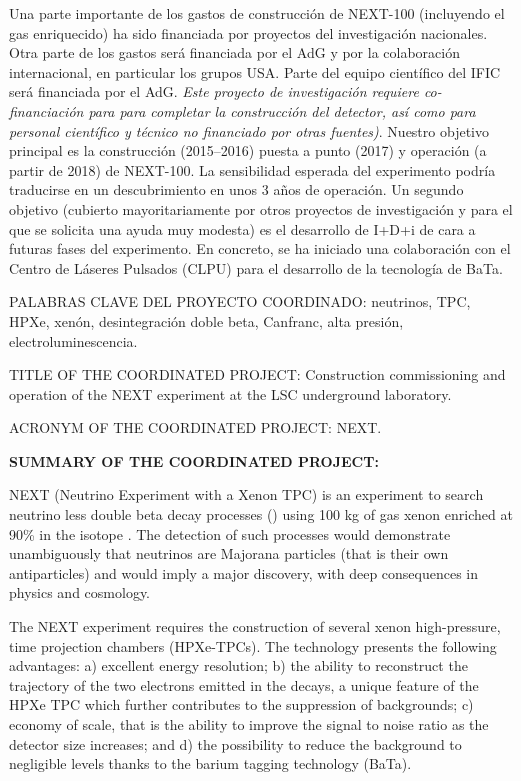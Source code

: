 \documentclass[a4paper,11pt,oneside]{article}
\begin{document}
Una parte importante de los gastos de construcción de NEXT-100 (incluyendo el gas enriquecido) ha sido financiada por proyectos del investigación nacionales. 
 Otra parte de los gastos será financiada por el AdG y por la colaboración internacional, en particular los grupos USA. Parte del equipo científico del IFIC será financiada por el AdG. {\em Este  proyecto de investigación requiere co-financiación para para completar la construcción del detector, así como para personal científico y técnico no financiado por otras fuentes)}. Nuestro objetivo principal es la construcción (2015--2016) puesta a punto (2017) y operación (a partir de 2018) de NEXT-100. La sensibilidad esperada del experimento podría traducirse en un descubrimiento en unos 3 años de operación.  Un segundo objetivo (cubierto mayoritariamente por otros proyectos de investigación y para el que se solicita una ayuda muy modesta) es el desarrollo de I+D+i de cara a futuras fases del experimento. En concreto, se ha iniciado una colaboración con el Centro de Láseres Pulsados (CLPU) para el desarrollo de la tecnología de {\sc BaTa}.
 
 \vspace{0.3cm}

{\sc PALABRAS CLAVE DEL PROYECTO COORDINADO:} neutrinos, TPC, HPXe, xenón, desintegración doble beta, Canfranc, alta presión, electroluminescencia. 

 \vspace{0.6cm}
{\sc TITLE OF THE COORDINATED PROJECT:} Construction commissioning and operation of the NEXT experiment at the LSC underground laboratory. 
\vspace{0.3cm}

{\sc ACRONYM OF THE COORDINATED PROJECT:} NEXT.
\vspace{0.3cm}

{\bf SUMMARY OF THE COORDINATED PROJECT:} 
\vspace{0.3cm}

NEXT (Neutrino Experiment with a Xenon TPC) is an experiment to search neutrino less double beta decay processes  (\bbonu) using 100 kg of gas xenon enriched at  90\% in the isotope \XE. The detection of such processes would demonstrate unambiguously that neutrinos are Majorana particles (that is their own antiparticles) and would imply a major discovery, with deep consequences in physics and cosmology. 

The NEXT experiment requires the construction of several xenon high-pressure, time projection chambers (HPXe-TPCs). The technology presents the following advantages: a) excellent energy resolution; b) the ability to reconstruct the trajectory of the two electrons emitted in the decays, a unique feature of the HPXe TPC which further contributes to the suppression of backgrounds; c) economy of scale, that is the ability to improve the signal to noise ratio as the detector size increases; and d) the possibility to reduce the background to negligible levels thanks to the barium tagging technology ({\sc BaTa}).
\end{document}
